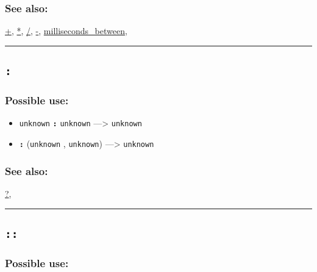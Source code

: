 \documentclass[]{book}
\providecommand{\tightlist}{%
  \setlength{\itemsep}{0pt}\setlength{\parskip}{0pt}}
\theoremstyle{definition}
\theoremstyle{definition}
\theoremstyle{definition}
\theoremstyle{remark}
\begin{document}
\subsubsection{See also:}\label{see-also}

\href{OperatorsAA\#+}{+}, \href{OperatorsAA\#*}{*},
\href{OperatorsAA\#/}{/}, \href{OperatorsAA\#-}{-},
\href{OperatorsIM\#milliseconds_between}{milliseconds\_between},

\begin{center}\rule{0.5\linewidth}{\linethickness}\end{center}

\subsection{\texorpdfstring{\texttt{:}}{:}}\label{section-2}

\subsubsection{Possible use:}\label{possible-use-1}

\begin{itemize}
\tightlist
\item
  \texttt{unknown} \textbf{\texttt{:}} \texttt{unknown}
  ---\textgreater{} \texttt{unknown}
\item
  \textbf{\texttt{:}} (\texttt{unknown} , \texttt{unknown})
  ---\textgreater{} \texttt{unknown}
\end{itemize}

\subsubsection{See also:}\label{see-also-1}

\href{OperatorsAA\#?}{?},

\begin{center}\rule{0.5\linewidth}{\linethickness}\end{center}

\subsection{\texorpdfstring{\texttt{::}}{::}}\label{section-3}

\subsubsection{Possible use:}\label{possible-use-2}
\end{document}
